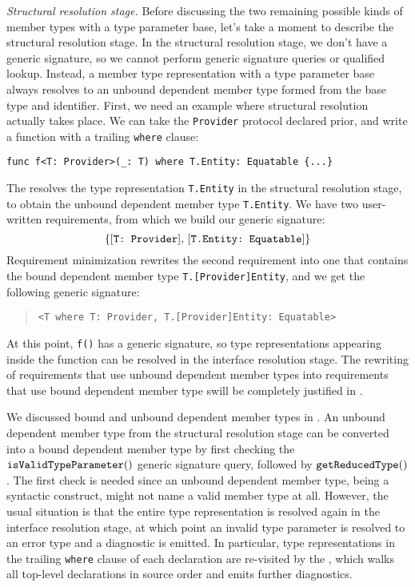 \documentclass[../generics]{subfiles}
\begin{document}
\emph{Structural resolution stage.} Before discussing the two remaining possible kinds of member types with a type parameter base, let's take a moment to describe the structural resolution stage. In the structural resolution stage, we don't have a generic signature, so we cannot perform generic signature queries or qualified lookup. Instead, a member type representation with a type parameter base always resolves to an unbound dependent member type formed from the base type and identifier. First, we need an example where structural resolution actually takes place. We can take the \texttt{Provider} protocol declared prior, and write a function with a trailing \texttt{where} clause:
\begin{Verbatim}
func f<T: Provider>(_: T) where T.Entity: Equatable {...}
\end{Verbatim}
The  resolves the type representation \texttt{T.Entity} in the structural resolution stage, to obtain the unbound dependent member type \texttt{T.Entity}. We have two user-written requirements, from which we build our generic signature:
\[\{[\texttt{T:~Provider}],\,[\texttt{T.Entity:~Equatable}]\}\]
Requirement minimization rewrites the second requirement into one that contains the bound dependent member type \texttt{T.[Provider]Entity}, and we get the following generic signature:
\begin{quote}
\begin{verbatim}
<T where T: Provider, T.[Provider]Entity: Equatable>
\end{verbatim}
\end{quote}
At this point, \texttt{f()} has a generic signature, so type representations appearing inside the function can be resolved in the interface resolution stage. The rewriting of requirements that use unbound dependent member types into requirements that use bound dependent member type swill be completely justified in .

We discussed bound and unbound dependent member types in . An unbound dependent member type from the structural resolution stage can be converted into a bound dependent member type by first checking the 
$\texttt{isValidTypeParameter}()$ generic signature query, followed by $\texttt{getReducedType}()$. The first check is needed since an unbound dependent member type, being a syntactic construct, might not name a valid member type at all. However, the usual situation is that the entire type representation is resolved again in the interface resolution stage, at which point an invalid type parameter is resolved to an error type and a diagnostic is emitted. In particular, type representations in the trailing \texttt{where} clause of each declaration are re-visited by the , which walks all top-level declarations in source order and emits further diagnostics.
\end{document}
